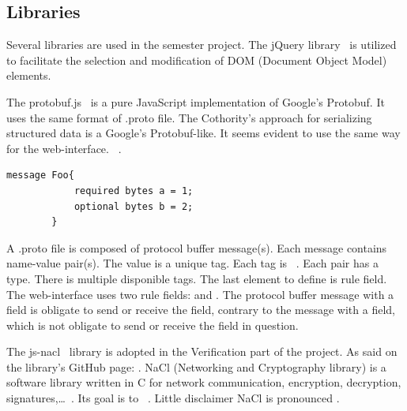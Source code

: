 \documentclass[11pt, a4paper, twoside, openright, openany]{article} %
\begin{document}
\subsection{Libraries}
Several libraries are used in the semester project.
\newline
The jQuery library~\cite{query} is utilized to
facilitate the selection and modification of DOM (Document Object Model) elements.
\bigbreak

The protobuf.js~\cite{protobufjs} is a pure JavaScript implementation of Google's Protobuf.
It uses the same format of .proto file.
The Cothority's approach for serializing structured data is a Google's Protobuf-like.
It seems evident to use the same way for the web-interface.
\newline
{}~\cite{protobufDefi}.
\bigbreak

\begin{lstlisting}[caption={Example of .proto file}, captionpos=b]
 message Foo{
            required bytes a = 1;
            optional bytes b = 2;
        }
\end{lstlisting}
\leavevmode \newline

A .proto file is composed of protocol buffer message(s). Each message contains name-value pair(s).
The value is a unique tag. Each tag is ~\cite{protobufDefi}.
Each pair has a type. There is multiple disponible tags.
\newline
The last element to define is rule field. The web-interface
uses two rule fields:  and . The protocol buffer message
with a  field is obligate to send or receive the field, contrary to
the message with a  field, which is not obligate to send or receive the field in question.
\bigbreak

The js-nacl~\cite{jsnacl} library is adopted in the Verification part of the project.
As said on the library's GitHub page: .
NaCl (Networking and Cryptography library) is a software library written in C for
network communication, encryption, decryption, signatures,\ldots~\cite{nacl}. Its
goal is to ~\cite{nacl}.
Little disclaimer NaCl is pronounced .
\bigbreak
\end{document}
